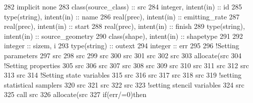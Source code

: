 \begin{DoxyCode}
282     \textcolor{keywordtype}{implicit none}
283     \textcolor{keywordtype}{class}(source\_class) :: src
284     \textcolor{keywordtype}{integer}, \textcolor{keywordtype}{intent(in)} :: id
285     \textcolor{keywordtype}{type}(string), \textcolor{keywordtype}{intent(in)} :: name
286     \textcolor{keywordtype}{real(prec)}, \textcolor{keywordtype}{intent(in)} :: emitting\_rate
287     \textcolor{keywordtype}{real(prec)}, \textcolor{keywordtype}{intent(in)} :: start
288     \textcolor{keywordtype}{real(prec)}, \textcolor{keywordtype}{intent(in)} :: finish
289     \textcolor{keywordtype}{type}(string), \textcolor{keywordtype}{intent(in)} :: source\_geometry
290     \textcolor{keywordtype}{class}(shape), \textcolor{keywordtype}{intent(in)} :: shapetype
291 
292     \textcolor{keywordtype}{integer} :: sizem, i
293     \textcolor{keywordtype}{type}(string) :: outext
294     \textcolor{keywordtype}{integer} :: err
295 
296     \textcolor{comment}{!Setting parameters}
297     src%
298     src%
299     src%
300     src%
301     src%
302     src%
303     \textcolor{keyword}{allocate}(src%
304     \textcolor{comment}{!Setting properties}
305     src%
306     src%
307     src%
308     src%
309     src%
310     src%
311     src%
312     src%
313     src%
314     \textcolor{comment}{!Setting state variables}
315     src%
316     src%
317     src%
318     src%
319     \textcolor{comment}{!setting statistical samplers}
320     src%
321     src%
322     src%
323     \textcolor{comment}{!setting stencil variables}
324     src%
325     \textcolor{keyword}{call }src%
326     \textcolor{keyword}{allocate}(src%
327     \textcolor{keywordflow}{if}(err/=0)\textcolor{keywordflow}{then}

\end{DoxyCode}
